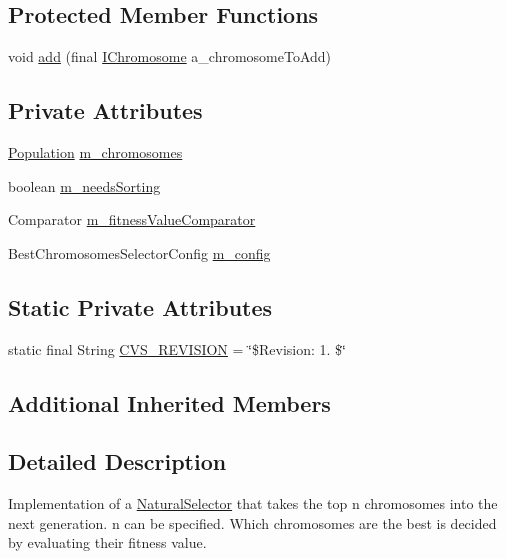 \subsection*{Protected Member Functions}
\begin{DoxyCompactItemize}
\item 
void \hyperlink{classorg_1_1jgap_1_1impl_1_1_best_chromosomes_selector_a0bc7fd36123954647b0c8a7e6ca8e5ae}{add} (final \hyperlink{interfaceorg_1_1jgap_1_1_i_chromosome}{I\-Chromosome} a\-\_\-chromosome\-To\-Add)
\end{DoxyCompactItemize}
\subsection*{Private Attributes}
\begin{DoxyCompactItemize}
\item 
\hyperlink{classorg_1_1jgap_1_1_population}{Population} \hyperlink{classorg_1_1jgap_1_1impl_1_1_best_chromosomes_selector_ad57ed87538c6396da97b9da75e7b9fcc}{m\-\_\-chromosomes}
\item 
boolean \hyperlink{classorg_1_1jgap_1_1impl_1_1_best_chromosomes_selector_a81d9b14ee7e7e116fbd1c71ec41ba059}{m\-\_\-needs\-Sorting}
\item 
Comparator \hyperlink{classorg_1_1jgap_1_1impl_1_1_best_chromosomes_selector_a22d07dd607627312855df65e2e4ea770}{m\-\_\-fitness\-Value\-Comparator}
\item 
Best\-Chromosomes\-Selector\-Config \hyperlink{classorg_1_1jgap_1_1impl_1_1_best_chromosomes_selector_a9b16ee07ecb31c2bd6b0af709cdd2248}{m\-\_\-config}
\end{DoxyCompactItemize}
\subsection*{Static Private Attributes}
\begin{DoxyCompactItemize}
\item 
static final String \hyperlink{classorg_1_1jgap_1_1impl_1_1_best_chromosomes_selector_a15ff008a0835eb0a54af6df185c864f9}{C\-V\-S\-\_\-\-R\-E\-V\-I\-S\-I\-O\-N} = \char`\"{}\$Revision\-: 1. \$\char`\"{}
\end{DoxyCompactItemize}
\subsection*{Additional Inherited Members}


\subsection{Detailed Description}
Implementation of a \hyperlink{classorg_1_1jgap_1_1_natural_selector}{Natural\-Selector} that takes the top n chromosomes into the next generation. n can be specified. Which chromosomes are the best is decided by evaluating their fitness value.

